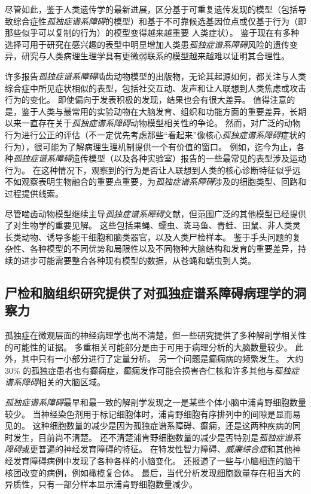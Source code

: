 尽管如此，鉴于人类遗传学的最新进展，区分基于可重复遗传发现的模型（包括导致综合症性\textit{孤独症谱系障碍}的模型）和基于不可靠候选基因位点或仅基于行为（即那些似乎可以复制的行为）的模型变得越来越重要 人类症状）。
鉴于现在有多种选择可用于研究在感兴趣的表型中明显增加人类患\textit{孤独症谱系障碍}风险的遗传变异，研究与人类病理生理学具有更微弱联系的模型越来越难以证明其合理性。


许多报告\textit{孤独症谱系障碍}啮齿动物模型的出版物，无论其起源如何，都关注与人类综合症中所见症状相似的表型，包括社交互动、发声和让人联想到人类焦虑或攻击行为的变化。
即使偏向于发表积极的发现，结果也会有很大差异。
值得注意的是，鉴于人类与最常用的实验动物在大脑发育、组织和功能方面的重要差异，长期以来一直存在关于\textit{孤独症谱系障碍}动物模型相关性的争论。
然而，对广泛的动物行为进行公正的评估（不一定优先考虑那些“看起来”像核心\textit{孤独症谱系障碍}症状的行为），很可能为了解病理生理机制提供一个有价值的窗口。
例如，迄今为止，各种\textit{孤独症谱系障碍}遗传模型（以及各种实验室）报告的一些最常见的表型涉及运动行为。
在这种情况下，观察到的行为是否让人联想到人类的核心诊断特征似乎远不如观察表明生物融合的重要点重要，为\textit{孤独症谱系障碍}涉及的细胞类型、回路和过程提供线索。


尽管啮齿动物模型继续主导\textit{孤独症谱系障碍}文献，但范围广泛的其他模型已经提供了对生物学的重要见解。
这些包括果蝇、蠕虫、斑马鱼、青蛙、田鼠、非人类灵长类动物、诱导多能干细胞和脑类器官，以及人类尸检样本。
鉴于手头问题的复杂性、各种模型的不同优势和局限性以及不同物种大脑结构和发育的重要差异，持续的进步可能需要整合各种现有模型的数据，从苍蝇和蠕虫到人类。



\subsection{尸检和脑组织研究提供了对孤独症谱系障碍病理学的洞察力}

孤独症在微观层面的神经病理学也尚不清楚，但一些研究提供了多种解剖学相关性的可能性的证据。
多重相关可能部分是由于可用于病理分析的大脑数量较少。
此外，其中只有一小部分进行了定量分析。
另一个问题是癫痫病的频繁发生。
大约 30\% 的孤独症患者也有癫痫症，癫痫发作可能会损害杏仁核和许多其他与\textit{孤独症谱系障碍}相关的大脑区域。


\textit{孤独症谱系障碍}最早和最一致的解剖学发现之一是某些个体小脑中浦肯野细胞数量较少。
当神经染色剂用于标记细胞体时，浦肯野细胞有序排列中的间隙是显而易见的。
这种细胞数量的减少是因为孤独症谱系障碍、癫痫，还是这两种疾病的同时发生，目前尚不清楚。
还不清楚浦肯野细胞数量的减少是否特别是\textit{孤独症谱系障碍}或更普遍的神经发育障碍的特征。
在特发性智力障碍、\textit{威廉综合症}和其他神经发育障碍病例中发现了各种各样的小脑变化。
还报道了一些与小脑相连的脑干核团改变的病例，例如橄榄复合体。
最后，当代分析发现细胞数量存在相当大的异质性，只有一部分样本显示浦肯野细胞数量减少。


